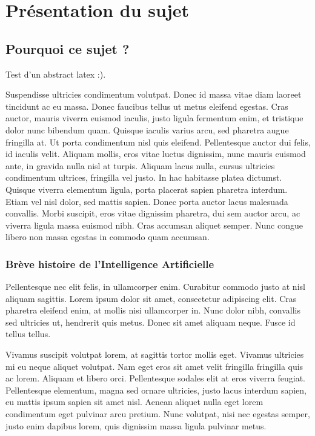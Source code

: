 \chapter{Présentation du sujet}

\section{Pourquoi ce sujet ?}

\textrm{Test d'un abstract latex :).}


Suspendisse ultricies condimentum volutpat. Donec id massa vitae diam laoreet tincidunt ac eu massa. Donec faucibus tellus ut metus eleifend egestas. Cras auctor, mauris viverra euismod iaculis, justo ligula fermentum enim, et tristique dolor nunc bibendum quam. Quisque iaculis varius arcu, sed pharetra augue fringilla at. Ut porta condimentum nisl quis eleifend. Pellentesque auctor dui felis, id iaculis velit. Aliquam mollis, eros vitae luctus dignissim, nunc mauris euismod ante, in gravida nulla nisl at turpis. Aliquam lacus nulla, cursus ultricies condimentum ultrices, fringilla vel justo. In hac habitasse platea dictumst. Quisque viverra elementum ligula, porta placerat sapien pharetra interdum. Etiam vel nisl dolor, sed mattis sapien. Donec porta auctor lacus malesuada convallis. Morbi suscipit, eros vitae dignissim pharetra, dui sem auctor arcu, ac viverra ligula massa euismod nibh. Cras accumsan aliquet semper. Nunc congue libero non massa egestas in commodo quam accumsan. 

\subsection{Brève histoire de l'Intelligence Artificielle}

Pellentesque nec elit felis, in ullamcorper enim. Curabitur commodo justo at nisl aliquam sagittis. Lorem ipsum dolor sit amet, consectetur adipiscing elit. Cras pharetra eleifend enim, at mollis nisi ullamcorper in. Nunc dolor nibh, convallis sed ultricies ut, hendrerit quis metus. Donec sit amet aliquam neque. Fusce id tellus tellus. 

Vivamus suscipit volutpat lorem, at sagittis tortor mollis eget. Vivamus ultricies mi eu neque aliquet volutpat. Nam eget eros sit amet velit fringilla fringilla quis ac lorem. Aliquam et libero orci. Pellentesque sodales elit at eros viverra feugiat. Pellentesque elementum, magna sed ornare ultricies, justo lacus interdum sapien, eu mattis ipsum sapien sit amet nisl. Aenean aliquet nulla eget lorem condimentum eget pulvinar arcu pretium. Nunc volutpat, nisi nec egestas semper, justo enim dapibus lorem, quis dignissim massa ligula pulvinar metus. 

